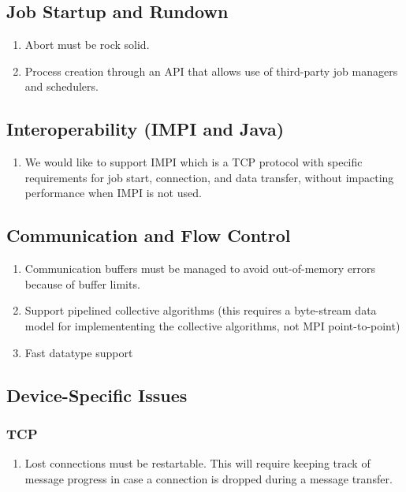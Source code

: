 \documentclass{article}
\begin{document}
\subsection{Job Startup and Rundown}
\begin{enumerate}
\item Abort must be rock solid.
\item Process creation through an API that allows use of third-party job
  managers and schedulers.
\end{enumerate}

\subsection{Interoperability (IMPI and Java)}
\begin{enumerate}
\item We would like to support IMPI which is a TCP protocol with specific
  requirements for job start, connection, and data transfer, without impacting
  performance when IMPI is not used.
\end{enumerate}

\subsection{Communication and Flow Control}
\begin{enumerate}
\item Communication buffers must be managed to avoid out-of-memory errors
  because of buffer limits.
\item Support pipelined collective algorithms (this requires a byte-stream
  data model for implemententing the collective algorithms, not MPI
  point-to-point) 
\item Fast datatype support
\end{enumerate}

\subsection{Device-Specific Issues}

\subsubsection{TCP}
\begin{enumerate}
\item Lost connections must be restartable.  This will require keeping track
  of message progress in case a connection is dropped during a message
  transfer. 
\end{enumerate}
\end{document}
